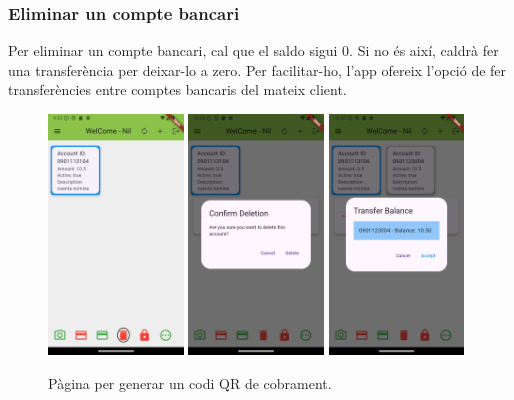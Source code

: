 \documentclass[a4paper,12pt,twoside]{ThesisStyle}
\begin{document}
\clearpage

\subsubsection{Eliminar un compte bancari}
\label{subsubsec:Eliminar un compte bancari}

Per eliminar un compte bancari, cal que el saldo sigui 0. Si no és així, caldrà fer una transferència per deixar-lo a zero. Per facilitar-ho, l'app ofereix l'opció de fer transferències entre comptes bancaris del mateix client.

\begin{figure}[h]
    \centering
    \includegraphics[width=0.32\textwidth]{imatges/mainpageAccount4.png}
    \includegraphics[width=0.32\textwidth]{imatges/deleteAccount.png}
    \includegraphics[width=0.32\textwidth]{imatges/transferBalance.png}
    \caption{Pàgina per generar un codi QR de cobrament.}
    \label{fig: Pàgina per generar codi QR de cobrament}
\end{figure}
\end{document}
